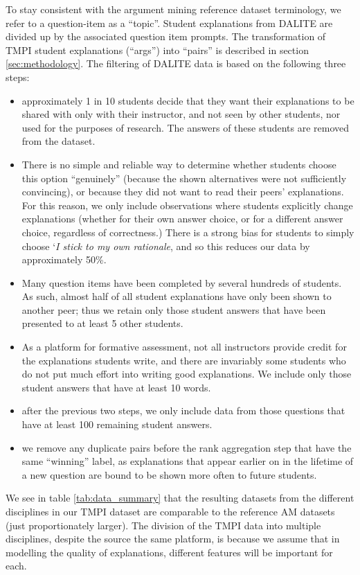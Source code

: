 \documentclass[notitlepage,12pt]{jedm}
\begin{document}
To stay consistent with the argument mining reference dataset terminology, we 
refer to a question-item as a ``topic''.
Student explanations from DALITE are divided up by the associated question item 
prompts.
The transformation of TMPI student explanations (``args'') into ``pairs'' is 
described in section \ref{sec:methodology}. 
The filtering of DALITE data is based on the following three steps:
\begin{itemize}
	\item approximately 1 in 10 students decide that they want their 
	explanations to be shared with only with their instructor, and not seen by 
	other students, nor used for the purposes of research.
	The answers of these students are removed from the dataset. 
	\item There is no simple and reliable way to determine whether students 
	choose this option ``genuinely'' (because the shown alternatives were not 
	sufficiently convincing), or because they did not want to read their peers' 
	explanations.
	For this reason, we only include observations where students explicitly 
	change explanations (whether for their own answer choice, or for a 
	different answer choice, regardless of correctness.) 
	There is a strong bias for students to simply choose `\textit{I stick to my 
	own rationale}, and so this reduces our data by approximately 50\%.
	\item Many question items have been completed by several hundreds of 
	students. 
	As such, almost half of all student explanations have only been shown to 
	another peer; thus we retain only those student answers that have been 
	presented to at least 5 other students.
	\item As a platform for formative assessment, not all instructors provide 
	credit for the explanations students write, and there are invariably some 
	students who do not put much effort into writing good explanations.
	We include only those student answers that have at least 10 words.
	\item after the previous two steps, we only include data from those 
	questions that have at least 100 remaining student answers.
	\item we remove any duplicate pairs before the rank aggregation step that 
	have the same ``winning'' label, as explanations that appear earlier on in 
	the lifetime of a new question are bound to be shown more often to future 
	students.
\end{itemize}

We see in table \ref{tab:data_summary} that the resulting datasets from the 
different disciplines in our TMPI dataset are comparable to the reference AM 
datasets (just proportionately larger).
The division of the TMPI data into multiple disciplines, despite the source the 
same platform, is because we assume that in modelling the quality of 
explanations, different features will be important for each.
\end{document}
